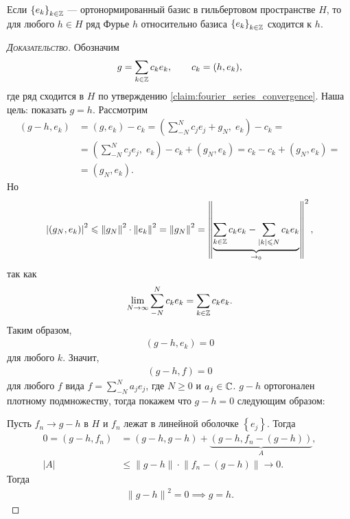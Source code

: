 \documentclass[../complex-analysis.tex]{subfiles}
\begin{document}
\begin{thm}
 Если $ \left\{e_k\right\}_{k \in \mathbb{Z}}  $ --- ортонормированный базис в гильбертовом пространстве $ H $, то для любого $ h \in H$ ряд Фурье $ h $ относительно базиса $ \left\{e_k\right\}_{k\in\mathbb{Z}}  $ сходится к $ h $.
\end{thm}
\begin{proof}[\normalfont\textsc{Доказательство}]
 Обозначим
 \begin{align*}
  g = \sum_{k\in\mathbb{Z}}c_ke_k,\qquad c_k=(h,e_k),
\end{align*} где ряд сходится в $ H $ по утверждению \eqref{claim:fourier_series_convergence}. Наша цель: показать $ g=h $. Рассмотрим
 \begin{align*}
  (g-h,e_k) &= (g,e_k) - c_k = \left(\sum_{-N}^{N}c_je_j + g_N,\; e_k \right) - c_k = \\
  &= \left( \sum_{-N}^{N}c_je_j,\;e_k \right) - c_k + (g_N,e_k) = c_k - c_k + (g_N,e_k) = \\
  &= (g_N,e_k).
 \end{align*} Но
 \begin{align*}
  \left| (g_N,e_k) \right|^{2} \leqslant \left\| g_N \right\|^{2} \cdot \left\| e_k \right\|^{2} = \left\| g_N \right\|^{2} = \left\| \underbrace{\sum_{k\in\mathbb{Z}}c_ke_k - \sum_{\left| k \right| \leqslant N} c_ke_k}_{\to_0} \right\|^{2},
 \end{align*} так как
 \begin{align*}
  \lim_{N \to \infty} \sum_{-N}^{N}c_ke_k = \sum_{k\in\mathbb{Z}}c_ke_k.
 \end{align*} Таким образом,
 \begin{align*}
  (g-h,e_k) = 0
 \end{align*} для любого $ k $. Значит,
 \begin{align*}
  (g-h,f) = 0
 \end{align*} для любого $ f $ вида $ f = \sum_{-N}^{N}a_je_j$, где $ N\geqslant 0 $ и $ a_j \in \mathbb{C} $. $ g-h $ ортогонален плотному подмножеству, тогда покажем что $g-h=0 $ следующим образом:

 Пусть $ f_n \to g-h $ в $ H $ и $ f_n $ лежат в линейной оболочке $ \left\{e_j\right\} $. Тогда
 \begin{align*}
	 0 = (g-h,f_n) &= (g-h,g-h) + \underbrace{(g-h,f_n - (g-h))}_A, \\
	 \left| A \right| &\leqslant \left\| g-h \right\| \cdot \left\| f_n - (g-h) \right\| \to 0.
 \end{align*} Тогда
 \begin{align*}
  \left\| g-h \right\|^{2} = 0 \implies g = h.
 \end{align*}
\end{proof}
\end{document}
